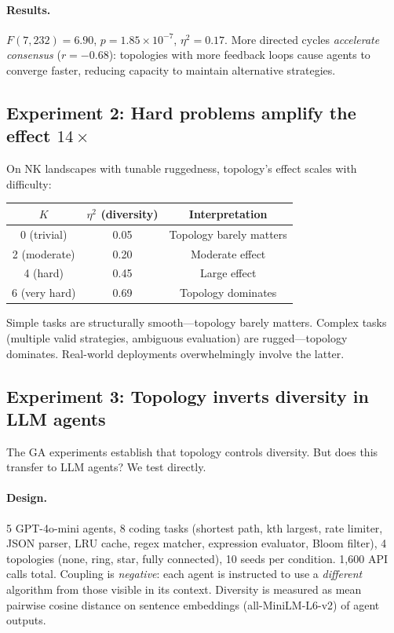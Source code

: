 \documentclass[10pt,twocolumn]{article}
\begin{document}
\paragraph{Results.}
$F(7, 232) = 6.90$, $p = 1.85 \times 10^{-7}$, $\eta^2 = 0.17$.
More directed cycles \emph{accelerate consensus} ($r = -0.68$):
topologies with more feedback loops cause agents to converge faster,
reducing capacity to maintain alternative strategies.

\subsection{Experiment 2: Hard problems amplify the effect $14\times$}

On NK landscapes with tunable ruggedness, topology's effect scales
with difficulty:

\begin{center}
\small
\begin{tabular}{@{}ccc@{}}
\toprule
$K$ & $\eta^2$ (diversity) & Interpretation \\
\midrule
0 (trivial) & 0.05 & Topology barely matters \\
2 (moderate) & 0.20 & Moderate effect \\
4 (hard) & 0.45 & Large effect \\
6 (very hard) & 0.69 & Topology dominates \\
\bottomrule
\end{tabular}
\end{center}

\noindent
Simple tasks are structurally smooth---topology barely matters.
Complex tasks (multiple valid strategies, ambiguous evaluation) are
rugged---topology dominates. Real-world deployments overwhelmingly
involve the latter.

\subsection{Experiment 3: Topology inverts diversity in LLM agents}
\label{sec:chorus}

The GA experiments establish that topology controls diversity.
But does this transfer to LLM agents? We test directly.

\paragraph{Design.}
5 GPT-4o-mini agents, 8 coding tasks (shortest path, kth largest,
rate limiter, JSON parser, LRU cache, regex matcher, expression
evaluator, Bloom filter), 4 topologies (none, ring, star, fully
connected), 10 seeds per condition. 1,600 API calls total.
Coupling is \emph{negative}: each agent is instructed to use a
\emph{different} algorithm from those visible in its context. Diversity
is measured as mean pairwise cosine distance on sentence embeddings
(all-MiniLM-L6-v2) of agent outputs.
\end{document}
